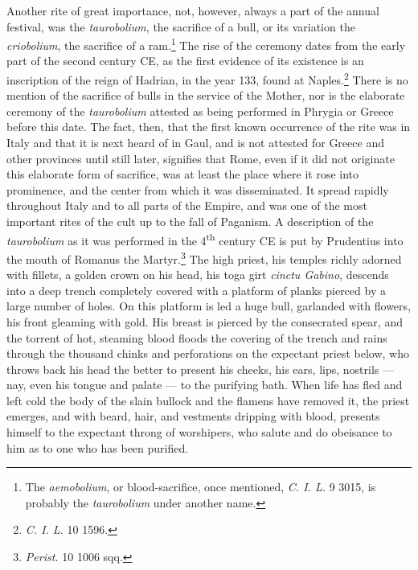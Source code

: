 \documentclass[a4paper, 11pt, oneside, polutonikogreek, french]{article}
\begin{document}
Another rite of great importance, not, however, always a part of the annual festival, was the \emph{taurobolium}, the sacrifice of a bull, or its variation the \emph{criobolium}, the sacrifice of a ram.\footnote{The \emph{aemobolium}, or blood-sacrifice, once mentioned, \emph{C. I. L.} 9 3015, is probably the \emph{taurobolium} under another name.} The rise of the ceremony dates from the early part of the second century \textsc{CE}, as the first evidence of its existence is an inscription of the reign of Hadrian, in the year 133, found at Naples.\footnote{\emph{C. I. L.} 10 1596.} There is no mention of the sacrifice of bulls in the service of the Mother, nor is the elaborate ceremony of the \emph{taurobolium} attested as being performed in Phrygia or Greece before this date. The fact, then, that the first known occurrence of the rite was in Italy and that it is next heard of in Gaul, and is not attested for Greece and other provinces until still later, signifies that Rome, even if it did not originate this elaborate form of sacrifice, was at least the place where it rose into prominence, and the center from which it was disseminated. It spread rapidly throughout Italy and to all parts of the Empire, and was one of the most important rites of the cult up to the fall of Paganism. A description of the \emph{taurobolium} as it was performed in the 4\textsuperscript{th} century \textsc{CE} is put by Prudentius into the mouth of Romanus the Martyr.\footnote{\emph{Perist.} 10 1006 sqq.} The high priest, his temples richly adorned with fillets, a golden crown on his head, his toga girt \emph{cinctu Gabino}, descends into a deep trench completely covered with a platform of planks pierced by a large number of holes. On this platform is led a huge bull, garlanded with flowers, his front gleaming with gold. His breast is pierced by the consecrated spear, and the torrent of hot, steaming blood floods the covering of the trench and rains through the thousand chinks and perforations on the expectant priest below, who throws back his head the better to present his cheeks, his ears, lips, nostrils --- nay, even his tongue and palate --- to the purifying bath. When life has fled and left cold the body of the slain bullock and the flamens have removed it, the priest emerges, and with beard, hair, and vestments dripping with blood, presents himself to the expectant throng of worshipers, who salute and do obeisance to him as to one who has been purified.
\end{document}
